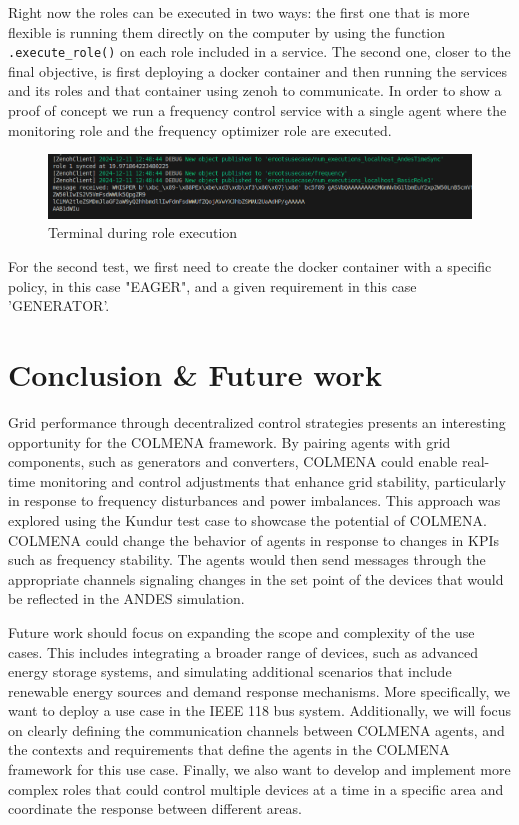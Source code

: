 \documentclass{article}
\begin{document}
Right now the roles can be executed in two ways: the first one that is more flexible is running them directly on the computer by using the function \texttt{.execute\_role()} on each role included in a service. The second one, closer to the final objective, is first deploying a docker container and then running the services and its roles and that container using zenoh to communicate. In order to show a proof of concept we run a frequency control service with a single agent where the monitoring role and the frequency optimizer role are executed.  

\begin{figure}[H] %
    \centering
    \includegraphics[width=1\textwidth]{pictures/screen_roles.png}
    \caption{Terminal during role execution}
    \label{fig:example_image}
\end{figure}

For the second test, we first need to create the docker container with a specific policy, in this case "EAGER", and a given requirement in this case 'GENERATOR'.  

\section{Conclusion \& Future work}

Grid performance through decentralized control strategies presents an interesting opportunity for the COLMENA framework. By pairing agents with grid components, such as generators and converters, COLMENA could enable real-time monitoring and control adjustments that enhance grid stability, particularly in response to frequency disturbances and power imbalances. This approach was explored using the Kundur test case to showcase the potential of COLMENA. COLMENA could change the behavior of agents in response to changes in KPIs such as frequency stability. The agents would then send messages through the appropriate channels signaling changes in the set point of the devices that would be reflected in the ANDES simulation.

Future work should focus on expanding the scope and complexity of the use cases. This includes integrating a broader range of devices, such as advanced energy storage systems, and simulating additional scenarios that include renewable energy sources and demand response mechanisms. More specifically, we want to deploy a use case in the IEEE 118 bus system. Additionally, we will focus on clearly defining the communication channels between COLMENA agents, and the contexts  and requirements that define the agents in the COLMENA framework for this use case. Finally, we also want to develop and implement more complex roles that could control multiple devices at a time in a specific area and coordinate the response between different areas.  


\nocite{*}
\printbibliography
\end{document}
